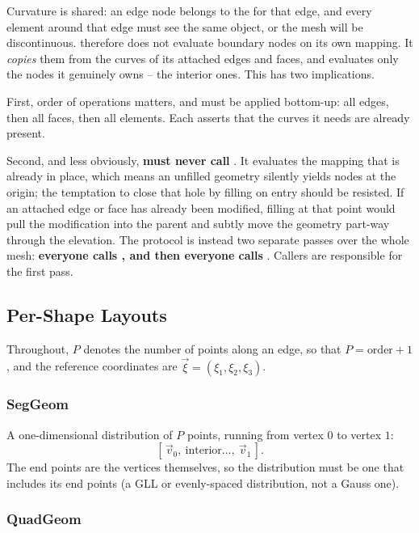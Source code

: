 Curvature is shared: an edge node belongs to the  for that edge,
and every element around that edge must see the same  object,
or the mesh will be discontinuous.   therefore does not
evaluate boundary nodes on its own mapping.  It \emph{copies} them from the
curves of its attached edges and faces, and evaluates only the nodes it
genuinely owns -- the interior ones.  This has two implications.

First, order of operations matters, and  must be applied
bottom-up: all edges, then all faces, then all elements.  Each
 asserts that the curves it needs are already present.

Second, and less obviously, \textbf{ must never call
}.  It evaluates the mapping that is already in place, which
means an unfilled geometry silently yields nodes at the origin; the temptation
to close that hole by filling on entry should be resisted.  If an attached edge
or face has already been modified, filling at that point would pull the
modification into the parent and subtly move the geometry part-way through the
elevation.  The protocol is instead two separate passes over the whole mesh:
\textbf{everyone calls , and then everyone calls
}.  Callers are responsible for the first pass.

\subsection{Per-Shape Layouts}
\label{sec:spatialdomains-orderings-shapes}

Throughout, $P$ denotes the number of points along an edge, so that
$P = \text{order} + 1$, and the reference coordinates are
$\vec{\xi} = (\xi_1, \xi_2, \xi_3)$.

\subsubsection{SegGeom}

A one-dimensional distribution of $P$ points, running from vertex $0$ to
vertex $1$:
%
$$
[\, \vec{v}_0,\ \text{interior} \ldots,\ \vec{v}_1 \,].
$$
%
The end points are the vertices themselves, so the distribution must be one
that includes its end points (a GLL or evenly-spaced distribution, not a Gauss
one).

\subsubsection{QuadGeom}

